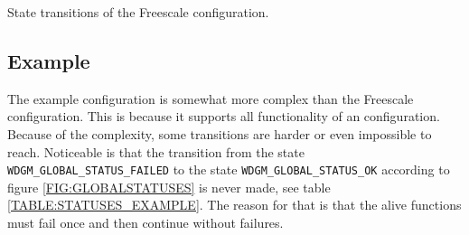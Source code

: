 \begin{table}[!ht]
  \caption{State transitions of the Freescale configuration.}
  \label{TABLE:STATUSES_FREESCALE}
  
\end{table}

\subsection{Example}
The example configuration is somewhat more complex than the Freescale
configuration. This is because it supports all functionality of an
configuration. Because of the complexity, some transitions are harder or
even impossible to reach. Noticeable is that the transition from the
state \lstinline!WDGM_GLOBAL_STATUS_FAILED! to the state
\lstinline!WDGM_GLOBAL_STATUS_OK! according to figure
\ref{FIG:GLOBALSTATUSES} is never made, see table
\ref{TABLE:STATUSES_EXAMPLE}. The reason for that is that the alive
functions must fail once and then continue without failures.
